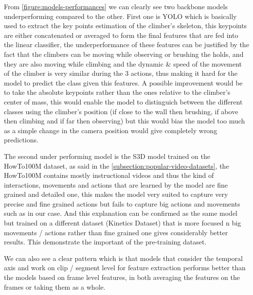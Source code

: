 
From \ref{figure:models-performances} we can clearly see two backbone models underperforming compared to the other. First one is YOLO which is basically used to extract the key points estimation of the climber's skeleton, this keypoints are either concatenated or averaged to form the final features that are fed into the linear classifier, the underperformance of these features can be justified by the fact that the climbers can be moving while observing or brushing the holds, and they are also moving while climbing and the dynamic \& speed of the movement of the climber is very similar during the 3 actions, thus making it hard for the model to predict the class given this features. A possible improvement would be to take the absolute keypoints rather than the ones relative to the climber's center of mass, this would enable the model to distinguich between the different classes using the climber's position (if close to the wall then brushing, if above then climbing and if far then observing) but this would bias the model too much as a simple change in the camera position would give completely wrong predictions. 

The second under performing model is the S3D model trained on the HowTo100M dataset, as said in the \ref{subsection:popular-video-datasets}, the HowTo100M contains mostly instructional videos and thus the kind of interactions, movements and actions that are learned by the model are fine grained and detailed one, this makes the model very suited to capture very precise and fine grained actions but fails to capture big actions and movements such as in our case.
And this explanation can be confirmed as the same model but trained on a different dataset (Kinetics Dataset) that is more focused n big movements / actions rather than fine grained one gives considerably better results.
This demonstrate the important of the pre-training dataset.

We can also see a clear pattern which is that models that consider the temporal axis and work on clip / segment level for feature extraction performs better than the models based on frame level features, in both averaging the features on the frames or taking them as a whole.


